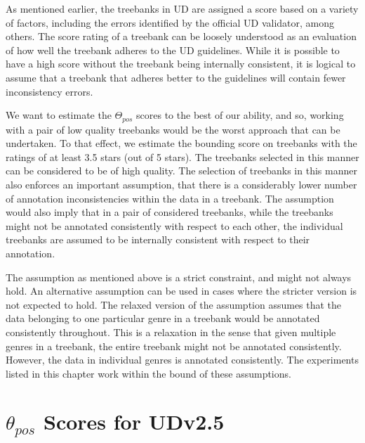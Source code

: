 As mentioned earlier, the treebanks in UD are assigned a score based on a variety of factors, including the errors identified by the official UD validator, among others. The score rating of a treebank can be loosely understood as an evaluation of how well the treebank adheres to the UD guidelines. While it is possible to have a high score without the treebank being internally consistent, it is logical to assume that a treebank that adheres better to the guidelines will contain fewer inconsistency errors. 

We want to estimate the $\Theta_{pos}$ scores to the best of our ability, and so, working with a pair of low quality treebanks would be the worst approach that can be undertaken. To that effect, we estimate the bounding score on treebanks with the ratings of at least 3.5 stars (out of 5 stars). The treebanks selected in this manner can be considered to be of high quality. The selection of treebanks in this manner also enforces an important assumption, that there is a considerably lower number of annotation inconsistencies within the data in a treebank. The assumption would also imply that in a pair of considered treebanks, while the treebanks might not be annotated consistently with respect to each other, the individual treebanks are assumed to be internally consistent with respect to their annotation.

The assumption as mentioned above is a strict constraint, and might not always hold. An alternative assumption can be used in cases where the stricter version is not expected to hold. The relaxed version of the assumption assumes that the data belonging to one particular genre in a treebank would be annotated consistently throughout. This is a relaxation in the sense that given multiple genres in a treebank, the entire treebank might not be annotated consistently. However, the data in individual genres is annotated consistently. The experiments listed in this chapter work within the bound of these assumptions. 

\section{\texorpdfstring{$\theta_{pos}$}{theta\_pos} Scores for UDv2.5}
\label{sec:pos-harmony-scores}

